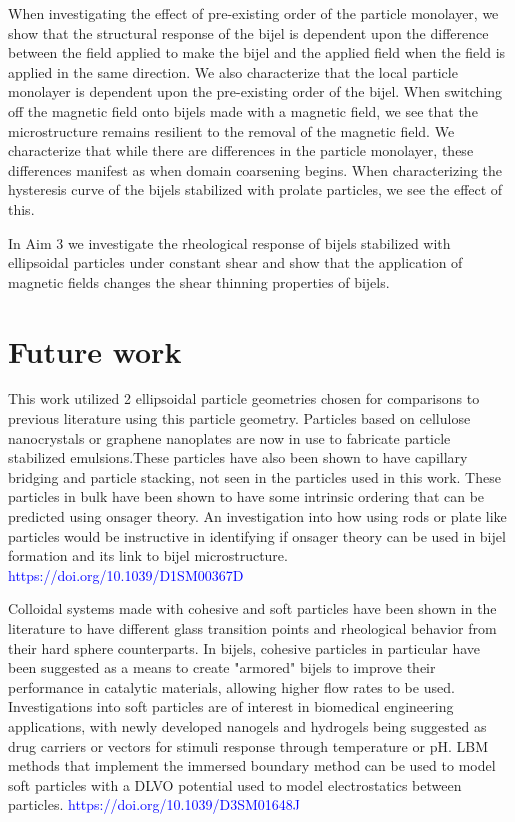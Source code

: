 When investigating the effect of pre-existing order of the particle monolayer, we show that the structural response of the bijel is dependent upon the
difference between the field applied to make the bijel and the applied field when the field is applied in the same direction. We also characterize that the
local particle monolayer is dependent upon the pre-existing order of the bijel. When switching off the magnetic field onto bijels made with a magnetic field,
we see that the microstructure remains resilient to the removal of the magnetic field. We characterize that while there are differences in the particle monolayer,
these differences manifest as when domain coarsening begins. When characterizing the hysteresis curve of the bijels stabilized with prolate particles,
we see the effect of this.

In Aim 3 we investigate the rheological response of bijels stabilized with ellipsoidal particles under constant shear and show that the application of magnetic
fields changes the shear thinning properties of bijels. 

\section{Future work}

This work utilized 2 ellipsoidal particle geometries chosen for comparisons to previous literature using this 
particle geometry. Particles based on cellulose nanocrystals or graphene nanoplates are now in use to fabricate
particle stabilized emulsions.These particles have also been shown to have capillary bridging and particle stacking,
not seen in the particles used in this work. These particles in bulk have been shown to have some intrinsic ordering
that can be predicted using onsager theory. An investigation into how using rods or plate like particles would be 
instructive in identifying if onsager theory can be used in bijel formation and its link to bijel microstructure. 
\textcolor{blue}{https://doi.org/10.1039/D1SM00367D}

Colloidal systems made with cohesive and soft particles have been shown in the literature to have different glass 
transition points and rheological behavior from their hard sphere counterparts. In bijels, cohesive particles in 
particular have been suggested as a means to create "armored" bijels to improve their performance in catalytic materials, 
allowing higher flow rates to be used. Investigations into soft particles are of interest in biomedical engineering 
applications, with newly developed nanogels and hydrogels being suggested as drug carriers or vectors for stimuli 
response through temperature or pH. LBM methods that implement the immersed boundary method can be used to model soft
particles with a DLVO potential used to model electrostatics between particles. \textcolor{blue}{https://doi.org/10.1039/D3SM01648J}

